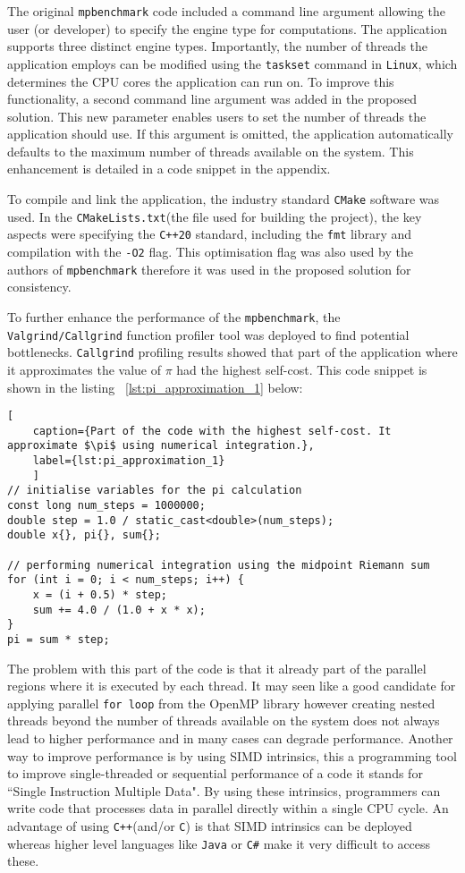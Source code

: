 The original \texttt{mpbenchmark} code included a command line argument allowing the user (or developer) to specify the engine type for computations. The application supports three distinct engine types. Importantly, the number of threads the application employs can be modified using the \texttt{taskset} command in \texttt{Linux}, which determines the CPU cores the application can run on. To improve this functionality, a second command line argument was added in the proposed solution. This new parameter enables users to set the number of threads the application should use. If this argument is omitted, the application automatically defaults to the maximum number of threads available on the system. This enhancement is detailed in a code snippet in the appendix.

To compile and link the application, the industry standard \texttt{CMake}\cite{cmake_about} software was used. In the \texttt{CMakeLists.txt}(the file used for building the project), the key aspects were specifying the \texttt{C++20} standard, including the \texttt{fmt} library and compilation with the \texttt{-O2} flag. This optimisation flag was also used by the authors of \texttt{mpbenchmark}\cite{mpbenchmark_paper} therefore it was used in the proposed solution for consistency. 

To further enhance the performance of the \texttt{mpbenchmark}, the \texttt{Valgrind/Callgrind} function profiler tool was deployed to find potential bottlenecks. \texttt{Callgrind} profiling results showed that part of the application where it approximates the value of $\pi$ had the highest self-cost. This code snippet is shown in the listing ~\ref{lst:pi_approximation_1} below:

\begin{lstlisting}[
	caption={Part of the code with the highest self-cost. It approximate $\pi$ using numerical integration.},
	label={lst:pi_approximation_1}
	]
// initialise variables for the pi calculation
const long num_steps = 1000000;
double step = 1.0 / static_cast<double>(num_steps);
double x{}, pi{}, sum{};

// performing numerical integration using the midpoint Riemann sum
for (int i = 0; i < num_steps; i++) {
	x = (i + 0.5) * step;
	sum += 4.0 / (1.0 + x * x);
}
pi = sum * step;
\end{lstlisting}

The problem with this part of the code is that it already part of the parallel regions where it is executed by each thread. It may seen like a good candidate for applying parallel \texttt{for loop} from the OpenMP library however creating nested threads beyond the number of threads available on the system does not always lead to higher performance and in many cases can degrade performance. Another way to improve performance is by using SIMD intrinsics, this a programming tool to improve single-threaded or sequential performance of a code it stands for ``Single Instruction Multiple Data". By using these intrinsics, programmers can write code that processes data in parallel directly within a single CPU cycle. An advantage of using \texttt{C++}(and/or \texttt{C}) is that SIMD intrinsics can be deployed whereas higher level languages like \texttt{Java} or \texttt{C\#} make it very difficult to access these. 

